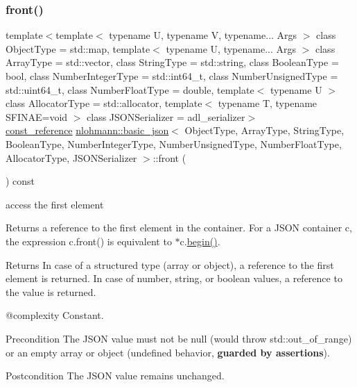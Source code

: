 \subsubsection{\texorpdfstring{front()}{front()}\hspace{0.1cm}{\footnotesize\ttfamily [2/2]}}
{\footnotesize\ttfamily template$<$template$<$ typename U, typename V, typename... Args $>$ class Object\+Type = std\+::map, template$<$ typename U, typename... Args $>$ class Array\+Type = std\+::vector, class String\+Type  = std\+::string, class Boolean\+Type  = bool, class Number\+Integer\+Type  = std\+::int64\+\_\+t, class Number\+Unsigned\+Type  = std\+::uint64\+\_\+t, class Number\+Float\+Type  = double, template$<$ typename U $>$ class Allocator\+Type = std\+::allocator, template$<$ typename T, typename S\+F\+I\+N\+A\+E=void $>$ class J\+S\+O\+N\+Serializer = adl\+\_\+serializer$>$ \\
\mbox{\hyperlink{classnlohmann_1_1basic__json_a4057c5425f4faacfe39a8046871786ca}{const\+\_\+reference}} \mbox{\hyperlink{classnlohmann_1_1basic__json}{nlohmann\+::basic\+\_\+json}}$<$ Object\+Type, Array\+Type, String\+Type, Boolean\+Type, Number\+Integer\+Type, Number\+Unsigned\+Type, Number\+Float\+Type, Allocator\+Type, J\+S\+O\+N\+Serializer $>$\+::front (\begin{DoxyParamCaption}{ }\end{DoxyParamCaption}) const\hspace{0.3cm}{\ttfamily [inline]}}



access the first element 

Returns a reference to the first element in the container. For a J\+S\+ON container {\ttfamily c}, the expression {\ttfamily c.\+front()} is equivalent to {\ttfamily $\ast$c.\mbox{\hyperlink{classnlohmann_1_1basic__json_a0ff28dac23f2bdecee9564d07f51dcdc}{begin()}}}.

\begin{DoxyReturn}{Returns}
In case of a structured type (array or object), a reference to the first element is returned. In case of number, string, or boolean values, a reference to the value is returned.
\end{DoxyReturn}
@complexity Constant.

\begin{DoxyPrecond}{Precondition}
The J\+S\+ON value must not be {\ttfamily null} (would throw {\ttfamily std\+::out\+\_\+of\+\_\+range}) or an empty array or object (undefined behavior, {\bfseries{guarded by assertions}}). 
\end{DoxyPrecond}
\begin{DoxyPostcond}{Postcondition}
The J\+S\+ON value remains unchanged.
\end{DoxyPostcond}

